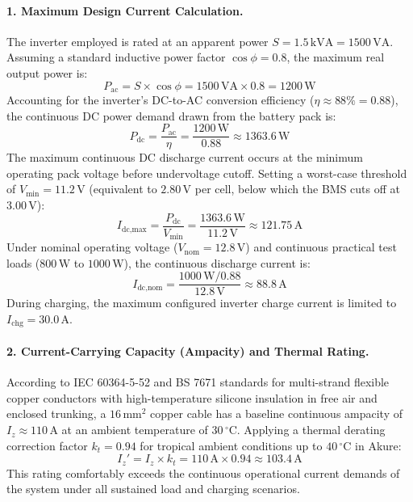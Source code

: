 \documentclass[12pt, a4paper]{report}
\begin{document}
{\paragraph{1. Maximum Design Current Calculation.}
The inverter employed is rated at an apparent power $S = 1.5\,\text{kVA} = 1500\,\text{VA}$. Assuming a standard inductive power factor $\cos\phi = 0.8$, the maximum real output power is:
\begin{equation}
    P_{\text{ac}} = S \times \cos\phi = 1500\,\text{VA} \times 0.8 = 1200\,\text{W}
    \label{eq:pac}
\end{equation}
Accounting for the inverter's DC-to-AC conversion efficiency ($\eta \approx 88\% = 0.88$), the continuous DC power demand drawn from the battery pack is:
\begin{equation}
    P_{\text{dc}} = \frac{P_{\text{ac}}}{\eta} = \frac{1200\,\text{W}}{0.88} \approx 1363.6\,\text{W}
    \label{eq:pdc}
\end{equation}
The maximum continuous DC discharge current occurs at the minimum operating pack voltage before undervoltage cutoff. Setting a worst-case threshold of $V_{\text{min}} = 11.2\,\text{V}$ (equivalent to $2.80\,\text{V}$ per cell, below which the BMS cuts off at $3.00\,\text{V}$):
\begin{equation}
    I_{\text{dc,max}} = \frac{P_{\text{dc}}}{V_{\text{min}}} = \frac{1363.6\,\text{W}}{11.2\,\text{V}} \approx 121.75\,\text{A}
    \label{eq:idc_max}
\end{equation}
Under nominal operating voltage ($V_{\text{nom}} = 12.8\,\text{V}$) and continuous practical test loads ($800\,\text{W}$ to $1000\,\text{W}$), the continuous discharge current is:
\begin{equation}
    I_{\text{dc,nom}} = \frac{1000\,\text{W} / 0.88}{12.8\,\text{V}} \approx 88.8\,\text{A}
    \label{eq:idc_nom}
\end{equation}
During charging, the maximum configured inverter charge current is limited to $I_{\text{chg}} = 30.0\,\text{A}$.

\paragraph{2. Current-Carrying Capacity (Ampacity) and Thermal Rating.}
According to IEC 60364-5-52 and BS 7671 standards for multi-strand flexible copper conductors with high-temperature silicone insulation in free air and enclosed trunking, a $16\,\text{mm}^{2}$ copper cable has a baseline continuous ampacity of $I_z \approx 110\,\text{A}$ at an ambient temperature of $30\,^{\circ}\text{C}$. Applying a thermal derating correction factor $k_t = 0.94$ for tropical ambient conditions up to $40\,^{\circ}\text{C}$ in Akure:
\begin{equation}
    I_z' = I_z \times k_t = 110\,\text{A} \times 0.94 \approx 103.4\,\text{A}
    \label{eq:ampacity}
\end{equation}
This rating comfortably exceeds the continuous operational current demands of the system under all sustained load and charging scenarios.

}
\end{document}
